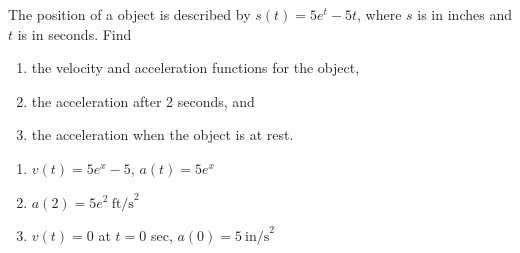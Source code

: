 {The position of a object is described by $s(t)=5e^t-5t$, where $s$ is in inches and $t$ is in seconds. Find
\begin{enumerate}
\item the velocity and acceleration functions for the object,
\item the acceleration after 2 seconds, and
\item the acceleration when the object is at rest.
\end{enumerate}}
{\begin{enumerate}
\item $v(t) = 5e^x-5$, $a(t)=5e^x$
\item $a(2) = 5e^2~ \text{ft/s}^2$\\  
\item $v(t)=0$ at $t=0$ sec, $a(0)=5~ \text{in/s}^2$ 
\end{enumerate}}
